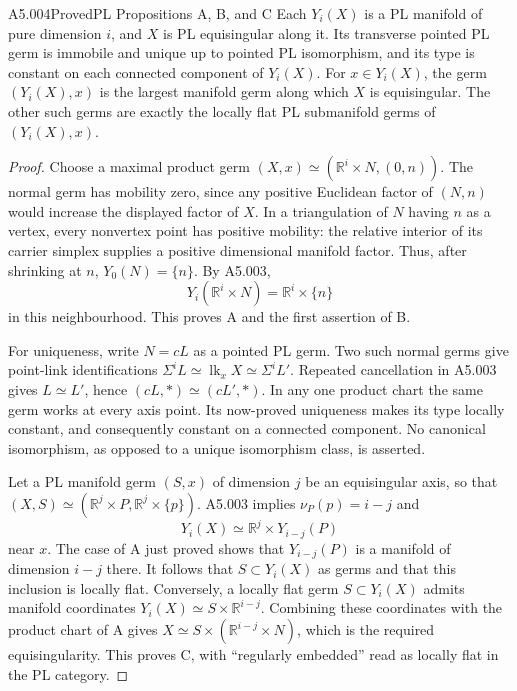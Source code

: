 \begin{saresult}{A5.004}{Proved}{PL Propositions A, B, and C}
Each $Y_i(X)$ is a PL manifold of pure dimension $i$, and $X$ is
PL equisingular along it.  Its transverse pointed PL germ is
immobile and unique up to pointed PL isomorphism, and its type is
constant on each connected component of $Y_i(X)$.  For $x\in Y_i(X)$,
the germ $(Y_i(X),x)$ is the largest manifold germ along which $X$ is
equisingular.  The other such germs are exactly the locally flat
PL submanifold germs of $(Y_i(X),x)$.
\end{saresult}
\begin{proof}
Choose a maximal product germ
$(X,x)\simeq(\mathbb R^i\times N,(0,n))$.  The normal germ has
mobility zero, since any positive Euclidean factor of $(N,n)$ would
increase the displayed factor of $X$.  In a triangulation of $N$
having $n$ as a vertex, every nonvertex point has positive mobility:
the relative interior of its carrier simplex supplies a positive
dimensional manifold factor.  Thus, after shrinking at $n$,
$Y_0(N)=\{n\}$.  By A5.003,
\[
       Y_i(\mathbb R^i\times N)=\mathbb R^i\times\{n\}
\]
in this neighbourhood.  This proves A and the first assertion of B.

For uniqueness, write $N=cL$ as a pointed PL germ.  Two such normal
germs give point-link identifications
$\Sigma^iL\simeq\operatorname{lk}_xX\simeq\Sigma^iL'$.
Repeated cancellation in A5.003 gives $L\simeq L'$, hence
$(cL,*)\simeq(cL',*)$.  In any one product chart the same germ works
at every axis point.  Its now-proved uniqueness makes its type
locally constant, and consequently constant on a connected
component.  No canonical isomorphism, as opposed to a unique
isomorphism class, is asserted.

Let a PL manifold germ $(S,x)$ of dimension $j$ be an equisingular
axis, so that $(X,S)\simeq(\mathbb R^j\times P,
\mathbb R^j\times\{p\})$.  A5.003 implies
$\nu_P(p)=i-j$ and
\[
 Y_i(X)\simeq\mathbb R^j\times Y_{i-j}(P)
\]
near $x$.  The case of A just proved shows that $Y_{i-j}(P)$ is a
manifold of dimension $i-j$ there.  It follows that $S\subset Y_i(X)$
as germs and that this inclusion is locally flat.  Conversely, a
locally flat germ $S\subset Y_i(X)$ admits manifold coordinates
$Y_i(X)\simeq S\times\mathbb R^{i-j}$.  Combining these coordinates
with the product chart of A gives
$X\simeq S\times(\mathbb R^{i-j}\times N)$, which is the required
equisingularity.  This proves C, with ``regularly embedded'' read
as locally flat in the PL category.
\end{proof}

